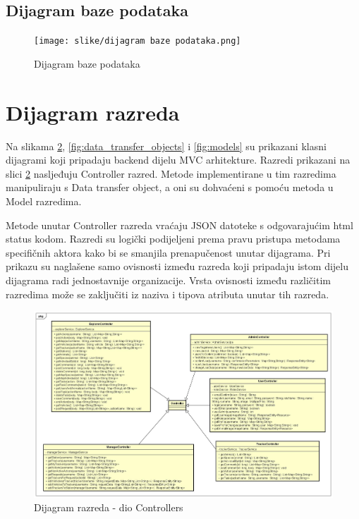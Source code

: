			\eject

			\subsection{Dijagram baze podataka}

			\begin{figure}[H]
				\texttt{[image: slike/dijagram baze podataka.png]} 
				\centering
				\caption{Dijagram baze podataka}
				\label{fig:dijagram_baze_podataka}
			\end{figure}
			
			\eject
			
			
		\section{Dijagram razreda}

		Na slikama \ref{fig:controllers}, \ref{fig:data_transfer_objects} i \ref{fig:models} su prikazani klasni dijagrami koji pripadaju backend dijelu MVC
		arhitekture. Razredi prikazani na slici \ref{fig:controllers} nasljeđuju Controller razred. 
		Metode implementirane u tim razredima manipuliraju s Data transfer object, a oni
		su dohvaćeni s pomoću metoda u Model razredima. 

		Metode unutar Controller razreda vraćaju JSON datoteke s odgovarajućim html status kodom.
		Razredi su logički podijeljeni prema pravu pristupa metodama specifičnih aktora kako bi se smanjila prenapučenost unutar dijagrama.
		Pri prikazu su naglašene samo ovisnosti između razreda koji pripadaju istom dijelu dijagrama radi jednostavnije organizacije.
		Vrsta ovisnosti između različitim razredima može se zaključiti iz naziva i tipova atributa unutar tih razreda.
		
		\eject

			\begin{figure}[H]
				\includegraphics[scale=0.4]{slike/klasni_dijagram_controllers.jpg}
				\centering
				\caption{Dijagram razreda - dio Controllers}
				\label{fig:controllers}
			\end{figure}
			
